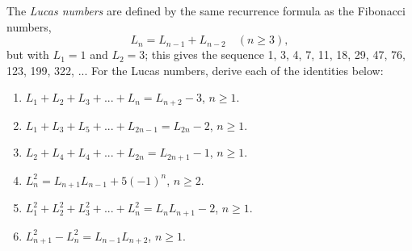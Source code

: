 \begin{exercise}
    The \textit{Lucas numbers} are defined by the same recurrence formula as the Fibonacci numbers,
    $$L_n = L_{n-1} + L_{n-2} \quad (n \geq 3),$$
    but with $L_1 = 1$ and $L_2 = 3$; this gives the sequence 1, 3, 4, 7, 11, 18, 29, 47, 76, 123, 199, 322, ... For the Lucas numbers, derive each of the identities below:
    \begin{enumerate}
        \item $L_1 + L_2 + L_3 + ... + L_n = L_{n+2} - 3$, $n \geq 1$.
        \item $L_1 + L_3 + L_5 + ... + L_{2n-1} = L_{2n} - 2$, $n \geq 1$.
        \item $L_2 + L_4 + L_4 + ...  + L_{2n} = L_{2n+1} - 1$, $n \geq 1$.
        \item $L_n^2 = L_{n+1}L_{n-1} + 5(-1)^n$, $n \geq 2$.
        \item $L_1^2 + L_2^2 + L_3^2 + ... + L_n^2 = L_nL_{n+1} - 2$, $n \geq 1$.
        \item $L_{n+1}^2 - L_n^2 = L_{n-1}L_{n+2}$, $n \geq 1$.\\
    \end{enumerate}
\end{exercise}

